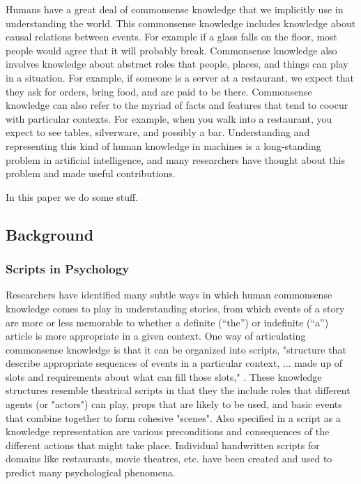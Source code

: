 \documentclass[10pt,a4paper]{article}
\newcommand{\todo}[1]{{\color{red}#1}}
\begin{document}
Humans have a great deal of commonsense knowledge that we implicitly use in understanding the world.
This commonsense knowledge includes knowledge about causal relations between events.
For example if a glass falls on the floor, most people would agree that it will probably break.
Commonsense knowledge also involves knowledge about abstract roles that people, places, and things can play in a situation.
For example, if someone is a server at a restaurant, we expect that they ask for orders, bring food, and are paid to be there.
Commonsense knowledge can also refer to the myriad of facts and features that tend to coocur with particular contexts.
For example, when you walk into a restaurant, you expect to see tables, silverware, and possibly a bar.
Understanding and representing this kind of human knowledge in machines is a long-standing problem in artificial intelligence, and many researchers have \todo{thought about this problem and made useful contributions.}

In this paper we \todo{do some stuff}.

\subsection{Background}

\subsubsection{Scripts in Psychology}

Researchers have identified many subtle ways in which human commonsense knowledge comes to play in understanding stories, from which events of a story are more or less memorable to whether a definite (“the”) or indefinite (“a”) article is more appropriate in a given context. One way of articulating commonsense knowledge is that it can be organized into scripts, "structure that describe appropriate sequences of events in a particular context, ... made up of slots and requirements about what can fill those slots," \cite{schank1977scripts}.
These knowledge structures resemble theatrical scripts in that they the include roles that different agents (or "actors") can play, props that are likely to be used, and basic events that combine together to form cohesive "scenes".
Also specified in a script as a knowledge representation are various preconditions and consequences of the different actions that might take place.
Individual handwritten scripts for domains like restaurants, movie theatres, etc. have been created and used to predict many psychological phenomena.
\end{document}
